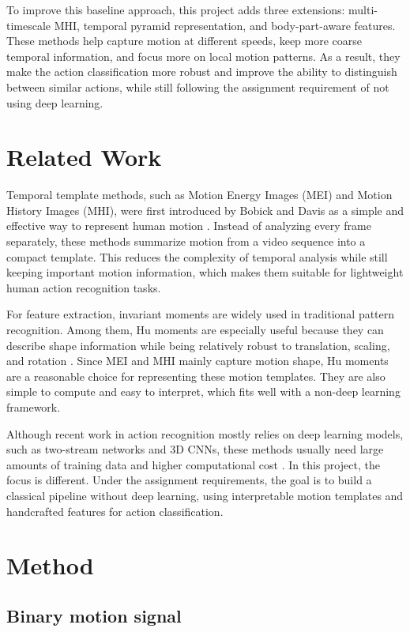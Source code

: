 \documentclass[11pt]{article}
\begin{document}
To improve this baseline approach, this project adds three extensions: multi-timescale MHI, temporal pyramid representation, and body-part-aware features. These methods help capture motion at different speeds, keep more coarse temporal information, and focus more on local motion patterns. As a result, they make the action classification more robust and improve the ability to distinguish between similar actions, while still following the assignment requirement of not using deep learning.

\section{Related Work}

Temporal template methods, such as Motion Energy Images (MEI) and Motion History Images (MHI), were first introduced by Bobick and Davis as a simple and effective way to represent human motion \cite{bobick2001}. Instead of analyzing every frame separately, these methods summarize motion from a video sequence into a compact template. This reduces the complexity of temporal analysis while still keeping important motion information, which makes them suitable for lightweight human action recognition tasks.

For feature extraction, invariant moments are widely used in traditional pattern recognition. Among them, Hu moments are especially useful because they can describe shape information while being relatively robust to translation, scaling, and rotation \cite{hu1962}. Since MEI and MHI mainly capture motion shape, Hu moments are a reasonable choice for representing these motion templates. They are also simple to compute and easy to interpret, which fits well with a non-deep learning framework.

Although recent work in action recognition mostly relies on deep learning models, such as two-stream networks and 3D CNNs, these methods usually need large amounts of training data and higher computational cost \cite{simonyan2014, carreira2017}. In this project, the focus is different. Under the assignment requirements, the goal is to build a classical pipeline without deep learning, using interpretable motion templates and handcrafted features for action classification.


\section{Method}

\subsection{Binary motion signal}
\end{document}

